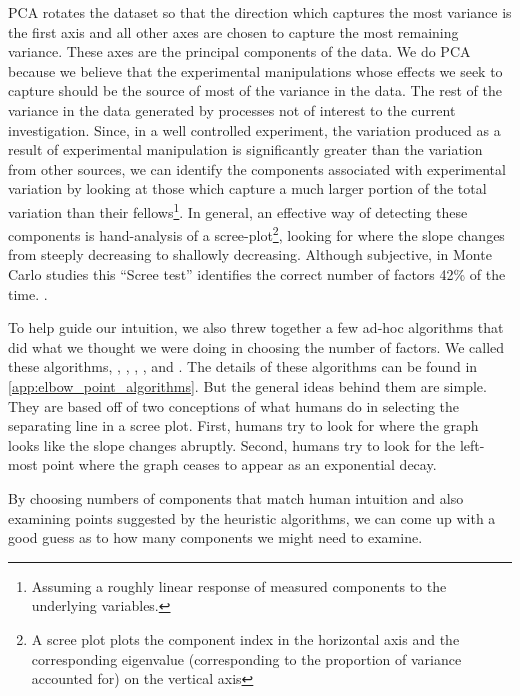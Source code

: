 \documentclass[eric_thesis.tex]{subfiles}
\begin{document}
PCA rotates the dataset so that the direction which captures the most variance 
is the first axis and all other axes are chosen to capture the most remaining 
variance. These axes are the principal components of the data. We do PCA because 
we believe that the experimental manipulations whose effects we seek to capture 
should be the source of most of the variance in the data. The rest of the 
variance in the data generated by processes not of interest to the current 
investigation. Since, in a well controlled experiment, the variation produced as 
a result of experimental manipulation is significantly greater than the 
variation from other sources, we can identify the components associated with 
experimental variation by looking at those which capture a much larger portion 
of the total variation than their fellows\footnote{Assuming a roughly linear 
response of measured components to the underlying variables.}. In general, an effective way of detecting these 
components is hand-analysis of a scree-plot\footnote{A scree plot plots the 
component index in the horizontal axis and the corresponding eigenvalue 
(corresponding to the proportion of variance accounted for) on the vertical 
axis}, looking for where the slope changes from steeply decreasing to shallowly 
decreasing. Although subjective, in Monte Carlo studies this ``Scree test'' 
identifies the correct number of factors 42\% of the time. . 

To help guide our intuition, we also threw together a few ad-hoc algorithms that 
did what we thought we were doing in choosing the number of factors. We called 
these algorithms, , , 
, , and 
. The details of these algorithms can 
be found in \ref{app:elbow_point_algorithms}. But the general ideas behind them 
are simple. They are based off of two conceptions of what humans do in selecting 
the separating line in a scree plot. First, humans try to look for where the 
graph looks like the slope changes abruptly. Second, humans try to look for the 
left-most point where the graph ceases to appear as an exponential decay.

By choosing numbers of components that match human intuition and also examining 
points suggested by the heuristic algorithms, we can come up with a good guess 
as to how many components we might need to examine. 
\end{document}
